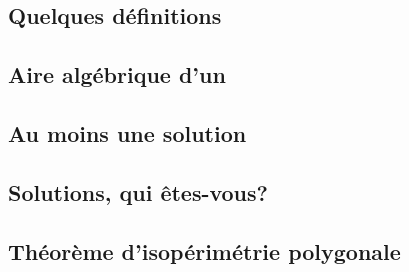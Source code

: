 \documentclass[12pt]{amsart}
\newcommand{\ncycle}{\xcycle{n}}
\begin{document}
\subsection{Quelques définitions}



\subsection{Aire algébrique d'un \ncycle}



\subsection{Au moins une solution}



\subsection{Solutions, qui êtes-vous?}



\subsection{Théorème d'isopérimétrie polygonale}

\end{document}
